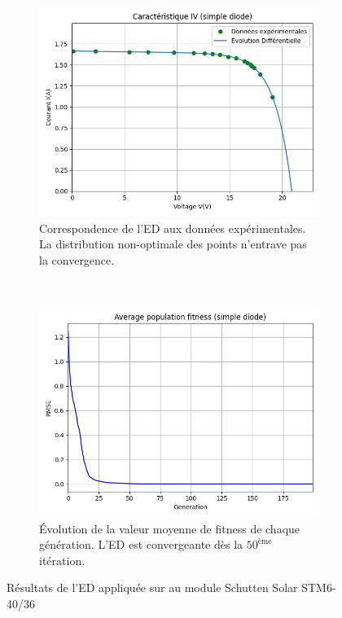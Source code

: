 \begin{figure}
    \centering
    \begin{subfigure}[b]{0.45\textwidth}
        \includegraphics[width=\textwidth]{resources/STM6/singled/iv.png}
        \caption{Correspondence de l'ED aux données expérimentales. La distribution non-optimale des points n'entrave pas la convergence.}
    \end{subfigure}
    ~
    \begin{subfigure}[b]{0.45\textwidth}
        \includegraphics[width=\textwidth]{resources/STM6/singled/fitness.png}
        \caption{Évolution de la valeur moyenne de fitness de chaque génération. L'ED est convergeante dès la $50^{\text{ème}}$ itération.}
    \end{subfigure}
    \caption{Résultats de l'ED appliquée sur au module Schutten Solar STM6-40/36}
    \label{fig:STM6res}
\end{figure}
